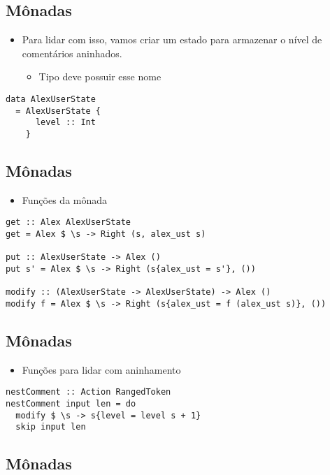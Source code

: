 \documentclass[11pt]{article}
\begin{document}
\subsection*{Mônadas}
\label{sec:org0fdef86}

\begin{itemize}
\item Para lidar com isso, vamos criar um estado para armazenar o nível de comentários aninhados.
\begin{itemize}
\item Tipo deve possuir esse nome
\end{itemize}
\end{itemize}

\begin{verbatim}
data AlexUserState
  = AlexUserState {
      level :: Int
    }
\end{verbatim}
\subsection*{Mônadas}
\label{sec:org12a5611}

\begin{itemize}
\item Funções da mônada
\end{itemize}

\begin{verbatim}
get :: Alex AlexUserState
get = Alex $ \s -> Right (s, alex_ust s)

put :: AlexUserState -> Alex ()
put s' = Alex $ \s -> Right (s{alex_ust = s'}, ())

modify :: (AlexUserState -> AlexUserState) -> Alex ()
modify f = Alex $ \s -> Right (s{alex_ust = f (alex_ust s)}, ())
\end{verbatim}
\subsection*{Mônadas}
\label{sec:org80bf425}

\begin{itemize}
\item Funções para lidar com aninhamento
\end{itemize}

\begin{verbatim}
nestComment :: Action RangedToken
nestComment input len = do
  modify $ \s -> s{level = level s + 1}
  skip input len
\end{verbatim}
\subsection*{Mônadas}
\label{sec:org3f80a4f}
\end{document}

